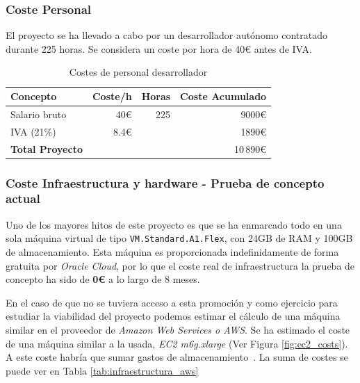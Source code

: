 \subsubsection{Coste Personal}

El proyecto se ha llevado a cabo por un desarrollador autónomo contratado durante 225 horas. Se considera un coste por hora de 40€ antes de IVA.

\begin{table}[!ht]
	\centering
	\begin{tabular}{lrrr}
		\toprule
		\textbf{Concepto} & \textbf{Coste/h} & \textbf{Horas} & \textbf{Coste Acumulado} \\
		\midrule
		Salario bruto & 40€ & 225 & 9000€\\
		IVA (21\%) & 8.4€ & & 1890€ \\
		\midrule
		\textbf{Total Proyecto} & & & 10\,890€ \\
		\bottomrule
	\end{tabular}
	\caption{Costes de personal desarrollador}
	\label{tab:personal}
\end{table}


\subsubsection{Coste Infraestructura y hardware - Prueba de concepto actual}

Uno de los mayores hitos de este proyecto es que se ha enmarcado todo en una sola máquina virtual de tipo \texttt{VM.Standard.A1.Flex}, con 24GB de RAM y 100GB de almacenamiento. Esta máquina es proporcionada indefinidamente de forma gratuita por \textit{Oracle Cloud}, por lo que el coste real de infraestructura la prueba de concepto ha sido de \textbf{0€} a lo largo de 8 meses. 

En el caso de que no se tuviera acceso a esta promoción y como ejercicio para estudiar la viabilidad del proyecto podemos estimar el cálculo de una máquina similar en el proveedor de \textit{Amazon Web Services o AWS}. Se ha estimado el coste de una máquina similar a la usada,  \textit{EC2 m6g.xlarge} (Ver Figura \ref{fig:ec2_costs}). A este coste  habría que sumar gastos de almacenamiento~\cite{ebs_pricing}. La suma de costes se puede ver en Tabla \ref{tab:infraestructura_aws}


